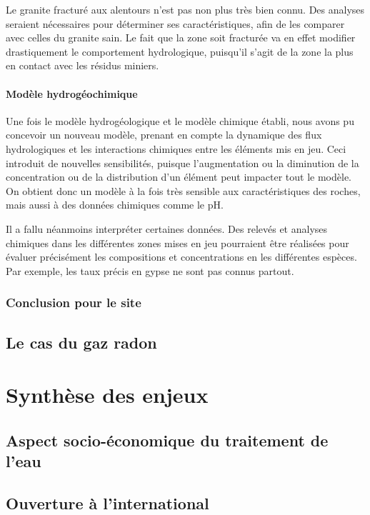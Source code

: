 \documentclass{article}
\begin{document}
Le granite fracturé aux alentours n’est pas non plus très bien connu. Des analyses seraient nécessaires pour déterminer ses caractéristiques, afin de les comparer avec celles du granite sain. Le fait que la zone soit fracturée va en effet modifier drastiquement le comportement hydrologique, puisqu’il s’agit de la zone la plus en contact avec les résidus miniers.

\paragraph{Modèle hydrogéochimique}

Une fois le modèle hydrogéologique et le modèle chimique établi, nous avons pu concevoir un nouveau modèle, prenant en compte la dynamique des flux hydrologiques et les interactions chimiques entre les éléments mis en jeu. Ceci introduit de nouvelles sensibilités, puisque l’augmentation ou la diminution de la concentration ou de la distribution d’un élément peut impacter tout le modèle. On obtient donc un modèle à la fois très sensible aux caractéristiques des roches, mais aussi à des données chimiques comme le pH.

Il a fallu néanmoins interpréter certaines données. Des relevés et analyses chimiques dans les différentes zones mises en jeu pourraient être réalisées pour évaluer précisément les compositions et concentrations en les différentes espèces. Par exemple, les taux précis en gypse ne sont pas connus partout.


\subsubsection{Conclusion pour le site}

\subsection{Le cas du gaz radon}

\newpage
\section{Synthèse des enjeux}
\subsection{Aspect socio-économique du traitement de l’eau}
\subsection{Ouverture à l’international}
\end{document}
